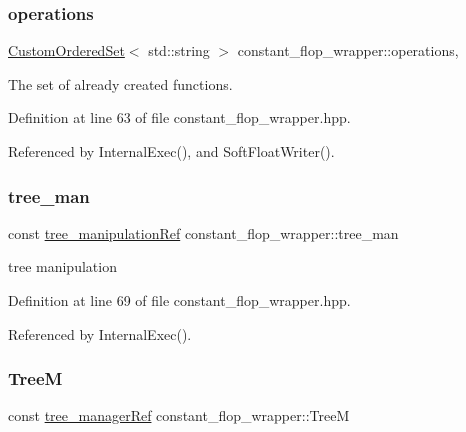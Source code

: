 \subsubsection{\texorpdfstring{operations}{operations}}
{\footnotesize\ttfamily \hyperlink{classCustomOrderedSet}{Custom\+Ordered\+Set}$<$ std\+::string $>$ constant\+\_\+flop\+\_\+wrapper\+::operations\hspace{0.3cm}{\ttfamily [static]}, {\ttfamily [protected]}}



The set of already created functions. 



Definition at line 63 of file constant\+\_\+flop\+\_\+wrapper.\+hpp.



Referenced by Internal\+Exec(), and Soft\+Float\+Writer().

\mbox{\label{classconstant__flop__wrapper_a41c86dc5e14de902afddb548d5f2e0d8}} 
\subsubsection{\texorpdfstring{tree\+\_\+man}{tree\_man}}
{\footnotesize\ttfamily const \hyperlink{tree__manipulation_8hpp_a1a9460e3a2f9fc6a96cfd2f24cc9b2a5}{tree\+\_\+manipulation\+Ref} constant\+\_\+flop\+\_\+wrapper\+::tree\+\_\+man\hspace{0.3cm}{\ttfamily [protected]}}



tree manipulation 



Definition at line 69 of file constant\+\_\+flop\+\_\+wrapper.\+hpp.



Referenced by Internal\+Exec().

\mbox{\label{classconstant__flop__wrapper_a9da1eb4ed1c4da9d815544ed38c0e872}} 
\subsubsection{\texorpdfstring{TreeM}{TreeM}}
{\footnotesize\ttfamily const \hyperlink{tree__manager_8hpp_a96ff150c071ce11a9a7a1e40590f205e}{tree\+\_\+manager\+Ref} constant\+\_\+flop\+\_\+wrapper\+::\+TreeM\hspace{0.3cm}{\ttfamily [protected]}}



